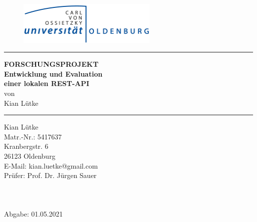 
\begin{titlepage}
\thispagestyle{empty}

\begin{center}
    \begin{figure}[t]
        \centering
        \includegraphics[width=0.6\textwidth]{images/logo_uol.png}
    \end{figure}
\end{center}

\begin{center}
    \vspace{1cm}
    \hrule 
    \vspace{2cm}
    \textbf{\huge\MakeUppercase{Forschungsprojekt}}\\
    \vspace{1cm}
    \textbf{\large Entwicklung und Evaluation}\\
    \textbf{\large einer lokalen REST-API}\\
    \vspace{1cm}
    von\\\vspace{0.25cm} {\large Kian Lütke}\\
    \vspace{\fill}
    \hrule
    \vspace{1cm}
\end{center}

\begin{multicols}{2}
{\small
\noindent
Kian Lütke\\
Matr.-Nr.: 5417637\\
Kranbergstr. 6\\
26123 Oldenburg\\
E-Mail: kian.luetke@gmail.com\\
}
{\small
Prüfer: Prof. Dr. Jürgen Sauer\\
\\
\\
\\
Abgabe: 01.05.2021
}
\end{multicols}

\end{titlepage}
